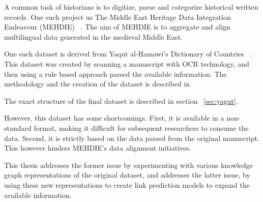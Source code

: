 A common task of historians is to digitize, parse and categorize historical written records.
One such project us The Middle East Heritage Data Integration Endeavour (MEHDIE) ~\cite{MEHDIE}.
The aim of MEHDIE is to aggregate and align multilingual data generated in the medieval Middle East.

One such dataset is derived from Yaqut al-Hamawi's Dictionary of Countries ~\cite{Yaqut}.
This dataset was created by scanning a manuscript with OCR technology, and then using a rule based approach parsed the
available information.
The methodology and the creation of the dataset is described in ~\cite{YaqutRB}

The exact structure of the final dataset is described in section ~\ref{sec:yagut}.

However, this dataset has some shortcomings.
First, it is available in a non-standard format, making it difficult for subsequent researchers to consume the data.
Second, it is strictly based on the data parsed from the original manuscript.
This however hinders MEHDIE's data alignment initiatives.

This thesis addresses the former issue by experimenting with various knowledge graph representations of the original dataset,
and addresses the latter issue, by using these new representations to create link prediction models to expand the available
information.
